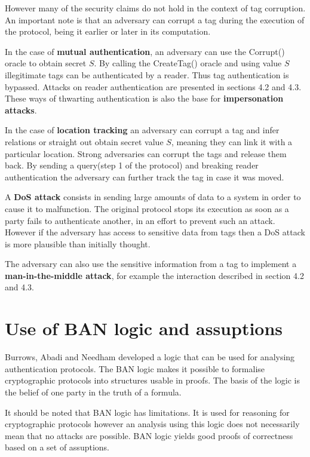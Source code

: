     However many of the security claims do not hold in the context of tag corruption. An important note is that an adversary can corrupt
    a tag during the execution of the protocol, being it earlier or later in its computation.

    In the case of \textbf{mutual authentication}, an adversary can use the Corrupt() oracle to obtain secret $S$. By calling the CreateTag()
    oracle and using value $S$ illegitimate tags can be authenticated by a reader. Thus tag authentication is bypassed. Attacks on reader 
    authentication are presented in sections 4.2 and 4.3. These ways of thwarting authentication is also the base for 
    \textbf{impersonation attacks}.
    
    In the case of \textbf{location tracking} an adversary can corrupt a tag and infer relations or straight out obtain secret value $S$, meaning
    they can link it with a particular location. Strong adversaries can corrupt the tags and release them back. By sending a query(step 1
    of the protocol) and breaking reader authentication the adversary can further track the tag in case it was moved.

    A \textbf{DoS attack} consists in sending large amounts of data to a system in order to cause it to malfunction. The original protocol
    stops its execution as soon as a party fails to authenticate another, in an effort to prevent such an attack. However if the adversary 
    has access to sensitive data from tags then a DoS attack is more plausible than initially thought.

    The adversary can also use the sensitive information from a tag to implement a \textbf{man-in-the-middle attack}, for example the 
    interaction described in section 4.2 and 4.3.

\section{Use of BAN logic and assuptions}
    Burrows, Abadi and Needham developed a logic that can be used for analysing authentication protocols. The BAN logic makes it possible
    to formalise cryptographic protocols into structures usable in proofs. The basis of the logic is the belief of one party in the truth
    of a formula. 

    It should be noted that BAN logic has limitations. It is used for reasoning for cryptographic protocols however an analysis using this
    logic does not necessarily mean that no attacks are possible. BAN logic yields good proofs of correctness based on a set of assuptions.

